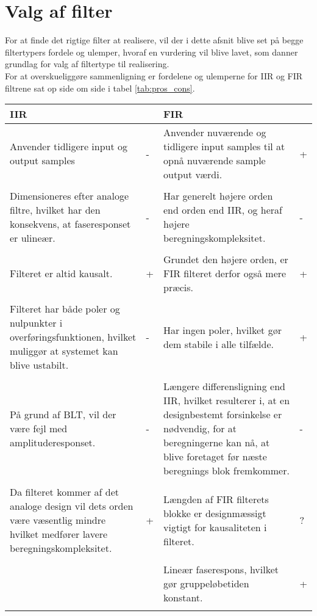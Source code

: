 \section{Valg af filter}\label{sec:dec_filter}
For at finde det rigtige filter at realisere, vil der i dette afsnit blive set på begge filtertypers fordele og ulemper, hvoraf en vurdering vil blive lavet, som danner grundlag for valg af filtertype til realisering. \\
For at overskueliggøre sammenligning er fordelene og ulemperne for IIR og FIR filtrene sat op side om side i tabel \ref{tab:pros_cons}.

\begin{table*}[ht]
\caption{Fordele og ulemper for IIR og FIR}
\centering
\label{tab:pros_cons}
\begin{tabular}{p{0.45\linewidth}p{0.05\linewidth}p{0.45\linewidth}p{0.05\linewidth}}
\toprule
IIR &  &FIR & \\
\midrule 
Anvender tidligere input og output samples & - & Anvender nuværende og tidligere input samples til at opnå nuværende sample output værdi. & + \\
& & & \\
Dimensioneres efter analoge filtre, hvilket har den konsekvens, at faseresponset er ulineær. & - & Har generelt højere orden end orden end IIR, og heraf højere beregningskompleksitet. & - \\ 
& & & \\
Filteret er altid kausalt. & + & Grundet den højere orden, er FIR filteret derfor også mere præcis. & + \\	
& & & \\
Filteret har både poler og nulpunkter i overføringsfunktionen, hvilket muliggør at systemet kan blive ustabilt. & - & Har ingen poler, hvilket gør dem stabile i alle tilfælde. & + \\
& & & \\
På grund af BLT, vil der være fejl med amplituderesponset. & - & Længere differensligning end IIR, hvilket resulterer i, at en designbestemt forsinkelse er nødvendig, for at beregningerne kan nå, at blive foretaget før næste beregnings blok fremkommer. & - \\
& & & \\
Da filteret kommer af det analoge design vil dets orden være væsentlig mindre hvilket medfører lavere beregningskompleksitet. & + & Længden af FIR filterets blokke er designmæssigt vigtigt for kausaliteten i filteret. & ? \\
& & & \\
& & Lineær faserespons, hvilket gør gruppeløbetiden konstant. & + \\
& & & \\
\bottomrule	
\end{tabular}
\end{table*}
\FloatBlock


